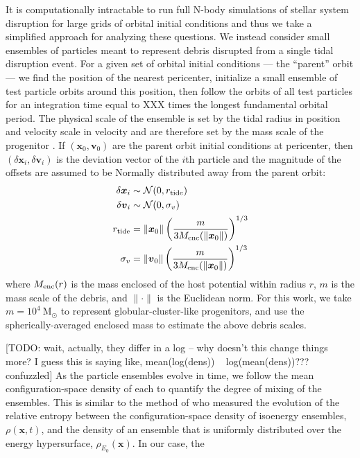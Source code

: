 \documentclass[letterpaper,12pt,preprint]{aastex}
\newcommand{\msun}{\ensuremath{\mathrm{M}_\odot}}
\newcommand{\bs}[1]{\boldsymbol{#1}}
\begin{document}
It is computationally intractable to run full N-body simulations of stellar system disruption for large grids of orbital initial conditions and thus we take a simplified approach for analyzing these questions. We instead consider small ensembles of particles meant to represent debris disrupted from a single tidal disruption event. For a given set of orbital initial conditions --- the ``parent'' orbit --- we find the position of the nearest pericenter, initialize a small ensemble of test particle orbits around this position, then follow the orbits of all test particles for an integration time equal to XXX times the longest fundamental orbital period. The physical scale of the ensemble is set by the tidal radius in position and velocity scale in velocity and are therefore set by the mass scale of the progenitor \citep[e.g.,][]{johnston98, apw14}. If $(\bs{x}_0,\bs{v}_0)$ are the parent orbit initial conditions at pericenter, then $(\delta\bs{x}_i,\delta\bs{v}_i)$ is the deviation vector of the $i$th particle and the magnitude of the offsets are assumed to be Normally distributed away from the parent orbit:
\begin{align}
	\delta\bs{x}_i &\sim \mathcal{N}(0, r_{\rm tide})\\
	\delta\bs{v}_i &\sim \mathcal{N}(0, \sigma_v)\\
	r_{\rm tide} &= \|\bs{x}_0\| \left(\frac{m}{3M_{\rm enc}(\|\bs{x}_0\|)}\right)^{1/3} \\
	\sigma_v &= \|\bs{v}_0\|\left(\frac{m}{3M_{\rm enc}(\|\bs{x}_0\|)}\right)^{1/3} 
\end{align}
where $M_{\rm enc}(r)$ is the mass enclosed of the host potential within radius $r$, $m$ is the mass scale of the debris, and $\|\cdot \|$ is the Euclidean norm. For this work, we take $m=10^4~\msun$ to represent globular-cluster-like progenitors, and use the spherically-averaged enclosed mass to estimate the above debris scales.

[TODO: wait, actually, they differ in a log -- why doesn't this change things more? I guess this is saying like, mean(log(dens)) ~ log(mean(dens))??? confuzzled]
As the particle ensembles evolve in time, we follow the mean configuration-space density of each to quantify the degree of mixing of the ensembles. This is similar to the method of \citet{merritt96} who measured the evolution of the relative entropy between the configuration-space density of isoenergy ensembles, $\rho(\bs{x},t)$, and the density of an ensemble that is uniformly distributed over the energy hypersurface, $\rho_{E_0}(\bs{x})$. In our case, the
\end{document}
